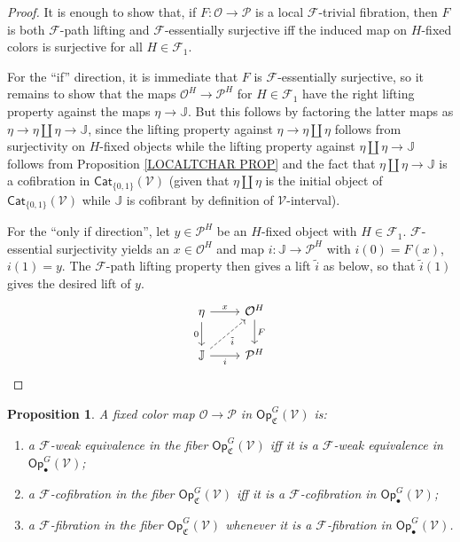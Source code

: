 \documentclass[a4paper,10pt
,draft
]{article}%
\numberwithin{equation}{section}
\numberwithin{figure}{section}
\newtheorem{proposition}[equation]{Proposition}%
\theoremstyle{definition} %
\newcommand{\F}{\ensuremath{\mathcal F}}
\newcommand{\V}{\ensuremath{\mathcal V}}
\renewcommand{\O}{\ensuremath{\mathcal O}}
\renewcommand{\P}{\ensuremath{\mathcal P}}
\newcommand{\1}{\ensuremath{\mathbbm 1}}%
\begin{document}
\begin{proof}
It is enough to show that,
if $F \colon \O \to \P$ is a local $\F$-trivial fibration,
then $F$ is both $\F$-path lifting and $\F$-essentially surjective
iff  the induced map on $H$-fixed colors is surjective for all $H \in \F_1$.


For the ``if'' direction, it is immediate that $F$ is
$\F$-essentially surjective, so it remains to show that
the maps $\O^H\to \P^H$ for $H \in \F_1$
have the right lifting property against the maps
$\eta \to \mathbb{J}$.
But this follows by factoring the latter maps as
$\eta \to \eta \amalg \eta \to \mathbb{J}$, 
since the lifting property against 
$\eta \to \eta \amalg \eta$ follows from surjectivity on $H$-fixed objects while the lifting property against
$\eta \amalg \eta \to \mathbb{J}$
follows from Proposition \ref{LOCALTCHAR PROP}
and the fact that 
$\eta \amalg \eta \to \mathbb{J}$
is a cofibration in $\mathsf{Cat}_{\{0,1\}}(\V)$
(given that $\eta \amalg \eta$ is the initial object of $\mathsf{Cat}_{\{0,1\}}(\V)$
while $\mathbb{J}$ is cofibrant by definition of $\V$-interval).

For the ``only if direction'', let $y \in \P^H$ be an $H$-fixed object with $H \in \F_1$.
$\F$-essential surjectivity yields an $x \in \O^H$ and map 
$i \colon \mathbb{J} \to \P^H$
with $i(0)=F(x)$, $i(1)=y$.
The $\F$-path lifting property then gives a lift $\tilde{i}$ as below, 
so that $\tilde{i}(1)$ gives the desired lift of $y$.
\[
\begin{tikzcd}
	\eta \ar{d}[swap]{0} \ar{r}{x}  
&
	\O^H \arrow{d}{F}
\\
	\mathbb{J} \ar{r}[swap]{i} \ar[dashed]{ru}[swap]{\tilde{i}}
&
	\P^H
\end{tikzcd}
\]   
\end{proof}



\begin{proposition}\label{FIBERGLMOD PROP}
A fixed color map
$\O \to \P$ in 
$\mathsf{Op}^G_{\mathfrak{C}}(\V)$ is:
\begin{enumerate}[label=(\roman*)]
\item a $\F$-weak equivalence in the fiber
$\mathsf{Op}_{\mathfrak{C}}^G(\V)$
iff it is a $\F$-weak equivalence in
$\mathsf{Op}_{\bullet}^G(\V)$;
\item a $\F$-cofibration in the fiber 
$\mathsf{Op}_{\mathfrak{C}}^G(\V)$
iff it is a $\F$-cofibration in
$\mathsf{Op}_{\bullet}^G(\V)$;
\item a $\F$-fibration in the fiber 
$\mathsf{Op}_{\mathfrak{C}}^G(\V)$
whenever it is a $\F$-fibration in
$\mathsf{Op}_{\bullet}^G(\V)$.
\end{enumerate}
\end{proposition}
\end{document}
